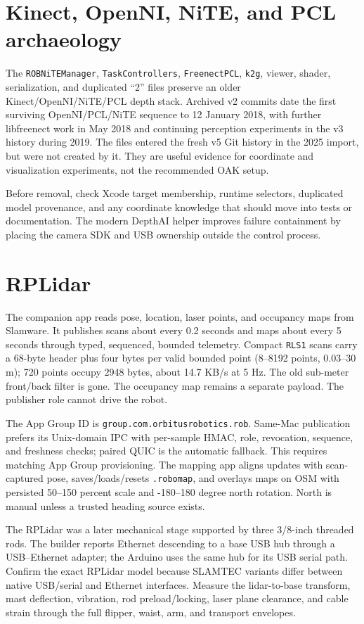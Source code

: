 \documentclass[10pt,openany]{book}
\begin{document}
\section{Kinect, OpenNI, NiTE, and PCL archaeology}

\Legacy\quad The \texttt{ROBNiTEManager}, \texttt{TaskControllers}, \texttt{FreenectPCL}, \texttt{k2g}, viewer, shader, serialization, and duplicated ``2'' files preserve an older Kinect/OpenNI/NiTE/PCL depth stack. Archived v2 commits date the first surviving OpenNI/PCL/NiTE sequence to 12 January 2018, with further libfreenect work in May 2018 and continuing perception experiments in the v3 history during 2019. The files entered the fresh v5 Git history in the 2025 import, but were not created by it. They are useful evidence for coordinate and visualization experiments, not the recommended OAK setup.

Before removal, check Xcode target membership, runtime selectors, duplicated model provenance, and any coordinate knowledge that should move into tests or documentation. The modern DepthAI helper improves failure containment by placing the camera SDK and USB ownership outside the control process.

\section{RPLidar}

\Experimental\quad The companion app reads pose, location, laser points, and occupancy maps from Slamware. It publishes scans about every 0.2 seconds and maps about every 5 seconds through typed, sequenced, bounded telemetry. Compact \texttt{RLS1} scans carry a 68-byte header plus four bytes per valid bounded point (8--8192 points, 0.03--30 m); 720 points occupy 2948 bytes, about 14.7 KB/s at 5 Hz. The old sub-meter front/back filter is gone. The occupancy map remains a separate payload. The publisher role cannot drive the robot.

The App Group ID is \texttt{group.com.orbitusrobotics.rob}. Same-Mac publication prefers its Unix-domain IPC with per-sample HMAC, role, revocation, sequence, and freshness checks; paired QUIC is the automatic fallback. This requires matching App Group provisioning. The mapping app aligns updates with scan-captured pose, saves/loads/resets \texttt{.robomap}, and overlays maps on OSM with persisted 50--150 percent scale and -180--180 degree north rotation. North is manual unless a trusted heading source exists.

The RPLidar was a later mechanical stage supported by three 3/8-inch threaded rods. The builder reports Ethernet descending to a base USB hub through a USB--Ethernet adapter; the Arduino uses the same hub for its USB serial path. Confirm the exact RPLidar model because SLAMTEC variants differ between native USB/serial and Ethernet interfaces. Measure the lidar-to-base transform, mast deflection, vibration, rod preload/locking, laser plane clearance, and cable strain through the full flipper, waist, arm, and transport envelopes.
\end{document}

